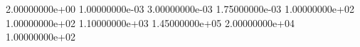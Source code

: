  2.00000000e+00
 1.00000000e-03
 3.00000000e-03
 1.75000000e-03
 1.00000000e+02
 1.00000000e+02
 1.10000000e+03
 1.45000000e+05
 2.00000000e+04
 1.00000000e+02
